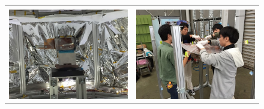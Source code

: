 \begin{figure}[H]
\begin{tabular}{cc}
\begin{minipage}{0.5\hsize}
\begin{center}
			\end{center}
		\end{minipage}\\
		\begin{minipage}{0.5\hsize}
			\begin{center}
				\includegraphics[width=1\textwidth]{03/fig/3-9-3-1-8.jpg}
			\end{center}
		\end{minipage}&
		\begin{minipage}{0.5\hsize}
			\begin{center}
				\includegraphics[width=1\textwidth]{03/fig/3-9-3-1-10.jpg}
			\end{center}
		\end{minipage}\\

\end{tabular}
\end{figure}
